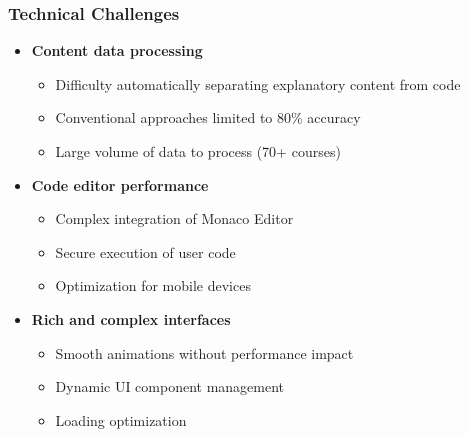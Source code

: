 \documentclass{beamer}
\begin{document}
\begin{frame}
\frametitle{Technical Challenges}
\begin{itemize}
    \item \textbf{Content data processing}
    \begin{itemize}
        \item Difficulty automatically separating explanatory content from code
        \item Conventional approaches limited to 80\% accuracy
        \item Large volume of data to process (70+ courses)
    \end{itemize}
    \item \textbf{Code editor performance}
    \begin{itemize}
        \item Complex integration of Monaco Editor
        \item Secure execution of user code
        \item Optimization for mobile devices
    \end{itemize}
    \item \textbf{Rich and complex interfaces}
    \begin{itemize}
        \item Smooth animations without performance impact
        \item Dynamic UI component management
        \item Loading optimization
    \end{itemize}
\end{itemize}
\end{frame}
\end{document}
